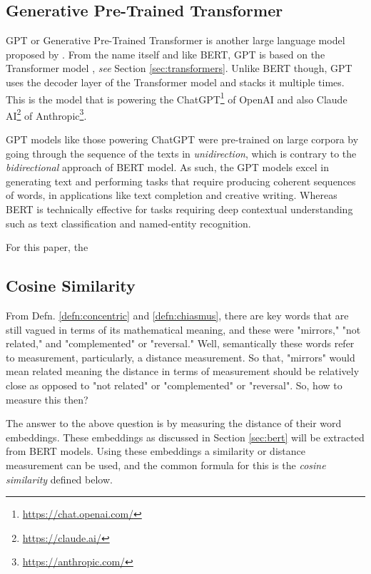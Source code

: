 \subsection{Generative Pre-Trained Transformer}
GPT or Generative Pre-Trained Transformer is another large language model proposed by \cite{radford2018improving}. From the name itself and like BERT, GPT is based on the Transformer model \cite{vaswani2017attention}, \textit{see} Section \ref{sec:transformers}. Unlike BERT though, GPT uses the decoder layer of the Transformer model and stacks it multiple times. This is the model that is powering the ChatGPT\footnote{\url{https://chat.openai.com/}} of OpenAI and also Claude AI\footnote{\url{https://claude.ai/}} of Anthropic\footnote{\url{https://anthropic.com/}}.

GPT models like those powering ChatGPT were pre-trained on large corpora by going through the sequence of the texts in \textit{unidirection}, which is contrary to the \textit{bidirectional} approach of BERT model. As such, the GPT models excel in generating text and performing tasks that require producing coherent sequences of words, in applications like text completion and creative writing. Whereas BERT is technically effective for tasks requiring deep contextual understanding such as text classification and named-entity recognition.

For this paper, the 
\subsection{Cosine Similarity}\label{sec:cosine_similarity}
From Defn. \ref{defn:concentric} and \ref{defn:chiasmus}, there are key words that are still vagued in terms of its mathematical meaning, and these were "mirrors," "not related," and "complemented" or "reversal." Well, semantically these words refer to measurement, particularly, a distance measurement. So that, "mirrors" would mean related meaning the distance in terms of measurement should be relatively close as opposed to "not related" or "complemented" or "reversal". So, how to measure this then?

The answer to the above question is by measuring the distance of their word embeddings. These embeddings as discussed in Section \ref{sec:bert} will be extracted from BERT models. Using these embeddings a similarity or distance measurement can be used, and the common formula for this is the \textit{cosine similarity} defined below.

